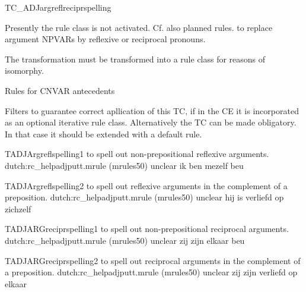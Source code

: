 \begin{mruleclass}{TC\_ADJargreflreciprspelling}
\begin{classdescr}
\kind Presently the rule class is not activated. Cf. also planned rules.
\classtask to replace argument NPVARs by reflexive or reciprocal pronouns.

\classremarks The transformation must be transformed into a rule class for 
reasons of isomorphy.
\nofilters

\nospeedrules

\begin{plannedrules}
\item Rules for CNVAR antecedents
\item Filters to guarantee correct apllication of this TC, if in the CE 
it is incorporated as an optional iterative rule class.
Alternatively the TC can be made obligatory. In that case it should 
be extended with a default rule.
\end{plannedrules}

\norulesnotince

\end{classdescr}

\begin{members}
\begin{member}
 TADJArgreflspelling1
 to spell out non-prepositional reflexive arguments.
\file dutch:rc\_helpadjputt.mrule (mrules50)
\semantics unclear
\example ik ben mezelf beu 
\remarks\mbox{}

\end{member}
\begin{member}
 TADJArgreflspelling2
 to spell out reflexive arguments in the complement of a 
preposition.
\file dutch:rc\_helpadjputt.mrule (mrules50)
\semantics unclear
\example hij is verliefd op zichzelf
\remarks\mbox{}

\end{member}
\begin{member}
 TADJARGreciprspelling1
 to spell out non-prepositional reciprocal arguments.
\file dutch:rc\_helpadjputt.mrule (mrules50)
\semantics unclear
\example zij zijn elkaar beu
\remarks\mbox{}

\end{member}
\begin{member}
 TADJARGreciprspelling2
 to spell out reciprocal arguments in the complement of a 
preposition.
\file dutch:rc\_helpadjputt.mrule (mrules50)
\semantics unclear
\example zij zijn verliefd op elkaar
\remarks\mbox{}

\end{member}
\end{members}
\end{mruleclass}


